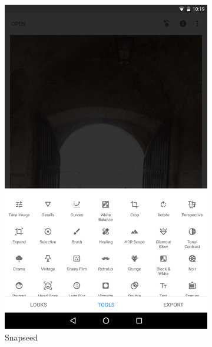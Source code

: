 \begin{figure}[t]
    \begin{subfigure}{0.4\textwidth}
        \includegraphics[width=\textwidth]{figures/ui/apps/uiSnapseed}
        \caption{Snapseed}
        \label{fig:appsUI_1}
    \end{subfigure}
    ~
    \begin{subfigure}{0.4\textwidth}

\end{subfigure}
\end{figure}
